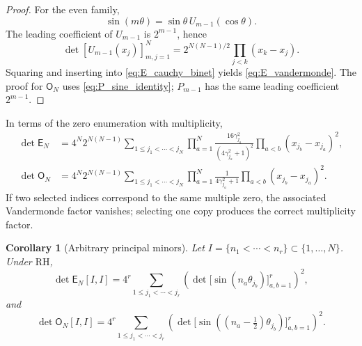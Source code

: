 \documentclass[preprint,12pt]{elsarticle}
\numberwithin{equation}{section}
\theoremstyle{plain}
\newtheorem{corollary}[theorem]{Corollary}
\theoremstyle{definition}
\theoremstyle{remark}
\newcommand{\RH}{\mathrm{RH}}
\newcommand{\E}{\mathsf E}
\newcommand{\Omat}{\mathsf O}
\begin{document}
\begin{proof}
For the even family,
\begin{equation}
\sin(m\theta)=\sin\theta\,U_{m-1}(\cos\theta).
\label{eq:sin_U_factor}
\end{equation}
The leading coefficient of $U_{m-1}$ is $2^{m-1}$, hence
\begin{equation}
\det[U_{m-1}(x_j)]_{m,j=1}^{N}
=2^{N(N-1)/2}\prod_{j<k}(x_k-x_j).
\label{eq:U_vandermonde}
\end{equation}
Squaring and inserting into \eqref{eq:E_cauchy_binet} yields \eqref{eq:E_vandermonde}. The proof for $\Omat_N$ uses \eqref{eq:P_sine_identity}; $P_{m-1}$ has the same leading coefficient $2^{m-1}$.
\end{proof}

In terms of the zero enumeration with multiplicity,
\begin{align}
\det\E_N
&=4^N2^{N(N-1)}
\sum_{1\le j_1<\cdots<j_N}
\prod_{a=1}^N\frac{16\gamma_{j_a}^2}{(4\gamma_{j_a}^2+1)^2}
\prod_{a<b}(x_{j_b}-x_{j_a})^2,
\label{eq:E_vandermonde_gamma}\\
\det\Omat_N
&=4^N2^{N(N-1)}
\sum_{1\le j_1<\cdots<j_N}
\prod_{a=1}^N\frac{1}{4\gamma_{j_a}^2+1}
\prod_{a<b}(x_{j_b}-x_{j_a})^2.
\label{eq:O_vandermonde_gamma}
\end{align}
If two selected indices correspond to the same multiple zero, the associated Vandermonde factor vanishes; selecting one copy produces the correct multiplicity factor.

\begin{corollary}[Arbitrary principal minors]
\label{cor:arbitrary_principal_minor_formula}
Let $I=\{n_1<\cdots<n_r\}\subset\{1,\dots,N\}$. Under $\RH$,
\begin{equation}
\det \E_N[I,I]
=4^r\sum_{1\le j_1<\cdots<j_r}
\left(\det\bigl[\sin(n_a\theta_{j_b})\bigr]_{a,b=1}^r\right)^2,
\label{eq:E_arbitrary_principal_minor}
\end{equation}
and
\begin{equation}
\det \Omat_N[I,I]
=4^r\sum_{1\le j_1<\cdots<j_r}
\left(\det\bigl[\sin((n_a-\tfrac12)\theta_{j_b})\bigr]_{a,b=1}^r\right)^2.
\label{eq:O_arbitrary_principal_minor}
\end{equation}
\end{corollary}
\end{document}
